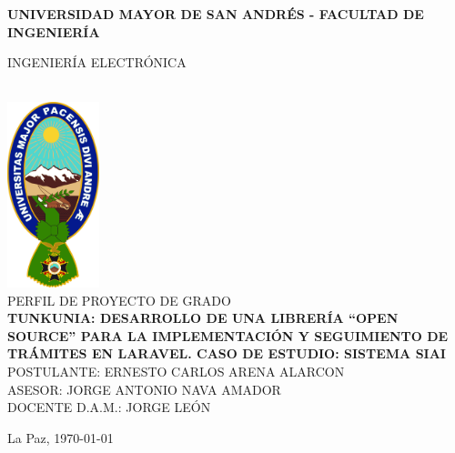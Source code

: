 \begin{titlepage}
	\centering
	{\bfseries \large UNIVERSIDAD MAYOR DE SAN ANDRÉS - FACULTAD DE INGENIERÍA\par INGENIERÍA ELECTRÓNICA }\\[2cm]

	\includegraphics[width=0.2\textwidth]{assets/umsa.png}
	\\[1cm]

	{\LARGE \MakeUppercase{Perfil de Proyecto de Grado}}\\[1cm]

	\textbf{\Large \MakeUppercase{TUNKUNIA: Desarrollo de una librería “Open Source” para la implementación y seguimiento de trámites en Laravel. Caso de estudio: Sistema SIAI}}
	\vfill
	\MakeUppercase{Postulante: } \MakeUppercase{Ernesto Carlos Arena Alarcon}\\[1cm]

	\MakeUppercase{Asesor: } \MakeUppercase{Jorge Antonio Nava Amador}\\[1cm]

	\MakeUppercase{Docente D.A.M.: } \MakeUppercase{Jorge León}\\[1cm]

	\vfill
	{La Paz, \today\par}
\end{titlepage}